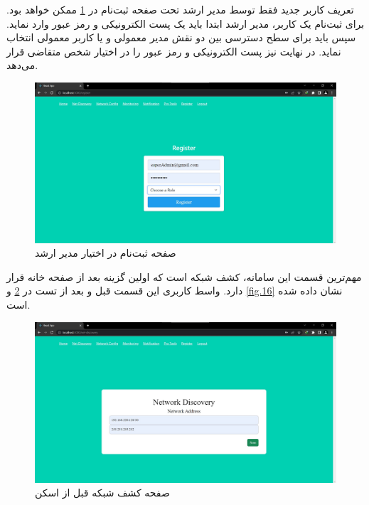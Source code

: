 \newpage

تعریف کاربر جدید فقط توسط مدیر ارشد تحت صفحه ثبت‌نام در \cref{fig.14} ممکن خواهد بود. برای ثبت‌نام یک کاربر، مدیر ارشد ابتدا باید یک پست الکترونیکی و رمز عبور وارد نماید. سپس باید برای سطح دسترسی بین دو نقش مدیر معمولی و یا کاربر معمولی انتخاب نماید. در نهایت نیز پست الکترونیکی و رمز عبور را در اختیار شخص متقاضی قرار می‌دهد.


\begin{figure}[!h]
    \centering\includegraphics[scale=.35]{./register}
    \caption{صفحه ثبت‌نام در اختیار مدیر ارشد}\label{fig.14}
\end{figure}

\cleardoublepage

مهم‌ترین قسمت این سامانه، کشف شبکه است که اولین گزینه بعد از صفحه خانه قرار دارد. واسط کاربری این قسمت قبل و بعد از تست در \cref{fig.15} و \cref{fig.16} نشان داده شده‌ است. 


\begin{figure}[!h]
    \centering\includegraphics[scale=.38]{./net-dis-before}
    \caption{صفحه کشف شبکه قبل از اسکن}\label{fig.15}
\end{figure}


